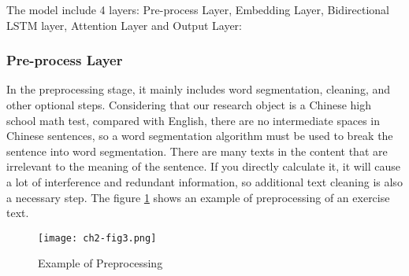 The model include 4 layers: Pre-process Layer, Embedding Layer, Bidirectional LSTM layer, Attention Layer and Output Layer: 
\subsubsection{Pre-process Layer}




In the preprocessing stage, it mainly includes word segmentation, cleaning, and other optional steps. Considering that our research object is a Chinese high school math test, compared with English, there are no intermediate spaces in Chinese sentences, so a word segmentation algorithm must be used to break the sentence into word segmentation. There are many texts in the content that are irrelevant to the meaning of the sentence. If you directly calculate it, it will cause a lot of interference and redundant information, so additional text cleaning is also a necessary step. The figure \ref{ch2-fig3} shows an example of preprocessing of an exercise text. 

\begin{figure}[h]
	\centering
	\texttt{[image: ch2-fig3.png]}
	\caption{Example of Preprocessing}
	\label{ch2-fig3}
\end{figure}


